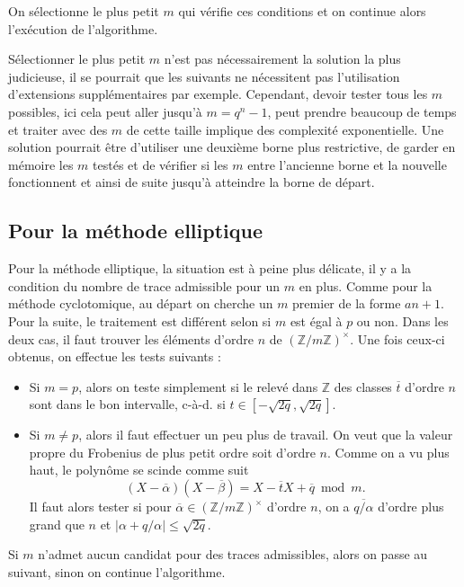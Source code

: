 \documentclass[a4paper]{article} %
\numberwithin{section}{part}
\numberwithin{equation}{section}
\newcommand\zmodninv[1]{(\mathbb{Z}/#1\mathbb{Z})^{\times}}
\newcommand\ZZ{\mathbb{Z}}
\begin{document}
On sélectionne le plus petit $m$ qui vérifie ces conditions et on continue alors
l'exécution de l'algorithme.

\begin{rem}
Sélectionner le plus petit $m$ n'est pas nécessairement la solution la plus
judicieuse, il se pourrait que les suivants ne nécessitent pas l'utilisation
d'extensions supplémentaires par exemple. Cependant, devoir tester tous les $m$
possibles, ici cela peut aller jusqu'à $m = q^n - 1$, peut prendre beaucoup de
temps et traiter avec des $m$ de cette taille implique des complexité
exponentielle. Une solution pourrait être d'utiliser une deuxième borne plus
restrictive, de garder en mémoire les $m$ testés et de vérifier si les $m$ entre
l'ancienne borne et la nouvelle fonctionnent et ainsi de suite jusqu'à atteindre
la borne de départ.
\end{rem}

\subsection{Pour la méthode elliptique}
\label{sec:recherchermell}
Pour la méthode elliptique, la situation est à peine plus délicate, il y a la
condition du nombre de trace admissible pour un $m$ en plus. Comme pour la 
méthode cyclotomique, au départ on cherche un $m$ premier de la forme $an + 1$. 
Pour la suite, le traitement est différent selon si $m$ est égal à $p$ ou non.
Dans les deux cas, il faut trouver les éléments d'ordre $n$ de $\zmodninv{m}$.
Une fois ceux-ci obtenus, on effectue les tests suivants :
\vspace{0.3cm}
\begin{itemize}
    \item Si $m = p$, alors on teste simplement si le relevé dans $\ZZ$ des
    classes $\overline{t}$ d'ordre $n$ sont dans le bon intervalle, 
    c-à-d. si $t\in[-\sqrt{2q},\sqrt{2q}]$.\vspace{0.2cm}

    \item Si $m\neq p$, alors il faut effectuer un peu plus de travail. On
    veut que la valeur propre du Frobenius de plus petit ordre soit d'ordre $n$.
    Comme on a vu plus haut, le polynôme se scinde comme suit 
    \[(X - \overline{\alpha})(X- \overline{\beta})= X -\overline{t}X + 
    \overline{q}\bmod m.\] 
    Il faut alors tester si pour $\overline{\alpha}\in\zmodninv{m}$ 
    d'ordre $n$, on a $\overline{q/\alpha}$ d'ordre plus grand que $n$ et 
    $\vert{\alpha + q/\alpha}\vert\leq\sqrt{2q}$.
\end{itemize}
\vspace{0.3cm}
Si $m$ n'admet aucun candidat pour des traces admissibles, alors on passe
au suivant, sinon on continue l'algorithme.
\end{document}
